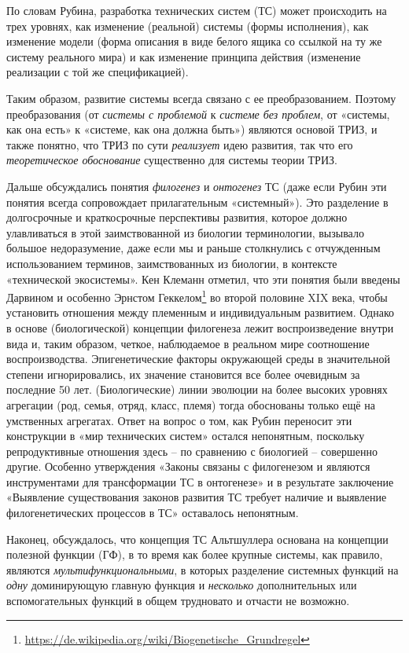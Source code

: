 \documentclass[a4paper,11pt]{article}
\begin{document}
По словам Рубина, разработка технических систем (ТС) может происходить на трех
уровнях, как изменение (реальной) системы (формы исполнения), как изменение
модели (форма описания в виде белого ящика со ссылкой на ту же систему
реального мира) и как изменение принципа действия (изменение реализации с той
же спецификацией).

Таким образом, развитие системы всегда связано с ее преобразованием. Поэтому
преобразования (от \emph{системы с проблемой} к \emph{системе без проблем}, от
«системы, как она есть» к «системе, как она должна быть») являются основой
ТРИЗ, и также понятно, что ТРИЗ по сути \emph{реализует} идею развития, так
что его \emph{теоретическое обоснование} существенно для системы теории ТРИЗ.

Дальше обсуждались понятия \emph{филогенез} и \emph{онтогенез} ТС (даже если
Рубин эти понятия всегда сопровождает прилагательным «системный»). Это
разделение в долгосрочные и краткосрочные перспективы развития, которое должно
улавливаться в этой заимствованной из биологии терминологии, вызывало большое
недоразумение, даже если мы и раньше столкнулись с отчужденным использованием
терминов, заимствованных из биологии, в контексте «технической
экосистемы». Кен Клеманн отметил, что эти понятия были введены Дарвином и
особенно Эрнстом
Геккелом\footnote{\url{https://de.wikipedia.org/wiki/Biogenetische_Grundregel}}
во второй половине XIX века, чтобы установить отношения между племенным и
индивидуальным развитием. Однако в основе (биологической) концепции филогенеза
лежит воспроизведение внутри вида и, таким образом, четкое, наблюдаемое в
реальном мире соотношение воспроизводства.  Эпигенетические факторы окружающей
среды в значительной степени игнорировались, их значение становится все более
очевидным за последние 50 лет.  (Биологические) линии эволюции на более
высоких уровнях агрегации (род, семья, отряд, класс, племя) тогда обоснованы
только ещё на умственных агрегатах.  Ответ на вопрос о том, как Рубин
переносит эти конструкции в «мир технических систем» остался непонятным,
поскольку репродуктивные отношения здесь -- по сравнению с биологией --
совершенно другие. Особенно утверждения «Законы связаны с филогенезом и
являются инструментами для трансформации ТС в онтогенезе» и в результате
заключение «Выявление существования законов развития ТС требует наличие и
выявление филогенетических процессов в ТС» оставалось непонятным.

Наконец, обсуждалось, что концепция ТС Альтшуллера основана на концепции
полезной функции (ГФ), в то время как более крупные системы, как правило,
являются \emph{мультифункциональными}, в которых разделение системных функций
на \emph{одну} доминирующую главную функция и \emph{несколько} дополнительных
или вспомогательных функций в общем трудновато и отчасти не возможно.
\end{document}
